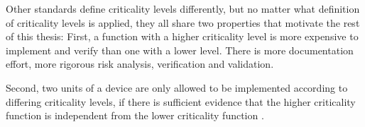 Other standards define criticality levels differently, but no matter what definition of criticality levels is applied, they all share two properties that motivate the rest of this thesis: First, a function with a higher criticality level is more expensive to implement and verify than one with a lower level. There is more documentation effort, more rigorous risk analysis, verification and validation. 

Second, two units of a device are only allowed to be implemented according to differing criticality levels, if there is sufficient evidence that the higher criticality function is independent from the lower criticality function \cite{IEC.2010-1}\cite{IEC.2010-2}.  %

